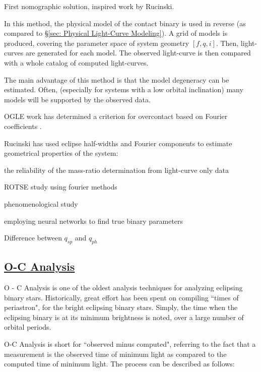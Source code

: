 \documentclass[12pt]{article} %
\numberwithin{equation}{section} %
\begin{document}
\citet{mochnacki1972model} First nomographic solution, inspired work by Rucinski. \citep{rucinski1973w}

In this method, the physical model of the contact binary is used in reverse (as compared to \S\ref{sec: Physical Light-Curve Modeling}). A grid of models is produced, covering the parameter space of system geometry $[f,q,i]$. Then, light-curves are generated for each model. The observed light-curve is then compared with a whole catalog of computed light-curves. 

The main advantage of this method is that the model degeneracy can be estimated. Often, (especially for systems with a low orbital inclination) many models will be supported by the observed data.

OGLE work has determined a criterion for overcontact based on Fourier coefficients \citep{rucinski1997eclipsing}. \citep{rucinski1993simple}

Rucinski has used eclipse half-widths and Fourier components to estimate geometrical properties of the system:

the reliability of the mass-ratio determination from light-curve only data \citep{hambalek2013reliability}

ROTSE study using fourier methods \citep{coker2013study}

phenomenological study \citep{andronov2012phenomenological}

employing neural networks to find true binary parameters \citep{zeraatgari2015neural}

Difference between $q_{sp}$ and $q_{ph}$ \citep{van1985contribution}

\citep{rucinski1973w} \citep{rucinski1993light} \citep{terrell2005photometric} \citep{hambalek2013}

\subsection[O-C Analysis]{\hyperlink{toc}{O-C Analysis}} \label{sec: O-C Analysis}

O - C Analysis is one of the oldest analysis techniques for analyzing eclipsing binary stars. Historically, great effort has been spent on compiling ``times of periastron", for the bright eclipsing binary stars. Simply, the time when the eclipsing binary is at its minimum brightness is noted, over a large number of orbital periods.

O-C Analysis is short for ``observed minus computed", referring to the fact that a measurement is the observed time of minimum light as compared to the computed time of minimum light. The process can be described as follows:
\end{document}
